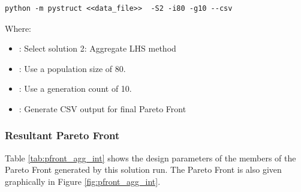 \begin{verbatim}
python -m pystruct <<data_file>>  -S2 -i80 -g10 --csv
\end{verbatim}

\noindent Where: 

\begin{itemize}
  \item {}: Select solution 2: Aggregate LHS method
  \item {}: Use a population size of 80. 
  \item {}: Use a generation count of 10. 
  \item {}: Generate CSV output for final Pareto Front
\end{itemize}

\subsubsection{Resultant Pareto Front}
Table \ref{tab:pfront_agg_int} shows the design parameters of the members of the Pareto Front generated by this solution run. The Pareto Front is also given graphically in Figure \ref{fig:pfront_agg_int}. 
